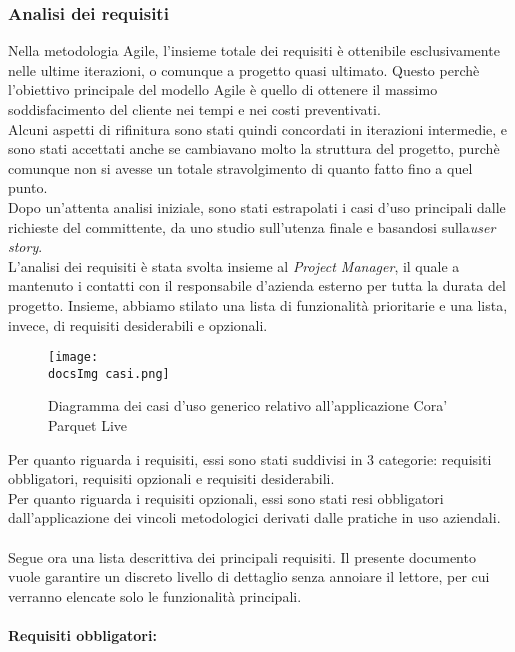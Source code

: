 \subsubsection{Analisi dei requisiti}
Nella metodologia Agile, l'insieme totale dei requisiti \`e ottenibile esclusivamente nelle ultime iterazioni, o comunque a progetto quasi ultimato. Questo perch\`e l'obiettivo principale del modello Agile \`e quello di ottenere il massimo soddisfacimento del cliente nei tempi e nei costi preventivati.\\
Alcuni aspetti di rifinitura sono stati quindi concordati in iterazioni intermedie, e sono stati accettati anche se cambiavano molto la struttura del progetto, purch\`e comunque non si avesse un totale stravolgimento di quanto fatto fino a quel punto.\\
Dopo un'attenta analisi iniziale, sono stati estrapolati i casi d'uso principali dalle richieste del committente, da uno studio sull'utenza finale e basandosi sulla\textit{user story}.\\
L'analisi dei requisiti \`e stata svolta insieme al \textit{Project Manager}, il quale a mantenuto i contatti con il responsabile d'azienda esterno per tutta la durata del progetto. Insieme, abbiamo stilato una lista di funzionalit\`a prioritarie e una lista, invece, di requisiti desiderabili e opzionali.

\begin{figure}[H]
	\centering
	\texttt{[image: \\docsImg casi.png]}
	\caption{Diagramma dei casi d'uso generico relativo all'applicazione Cora' Parquet Live}
	\label{fig:Diagramma dei casi d'uso generico relativo all'applicazione Cora' Parquet Live}
\end{figure}

Per quanto riguarda i requisiti, essi sono stati suddivisi in 3 categorie: requisiti obbligatori, requisiti opzionali e requisiti desiderabili.\\
Per quanto riguarda i requisiti opzionali, essi sono stati resi obbligatori dall'applicazione dei vincoli metodologici derivati dalle pratiche in uso aziendali.\\\\
Segue ora una lista descrittiva dei principali requisiti. Il presente documento vuole garantire un discreto livello di dettaglio senza annoiare il lettore, per cui verranno elencate solo le funzionalit\`a principali.\\\\

\textbf{Requisiti obbligatori:}

